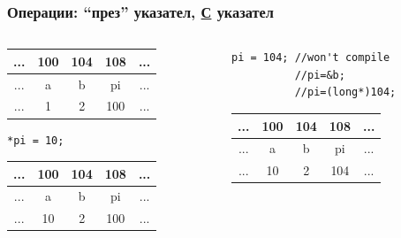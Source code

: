 \documentclass{beamer}
\begin{document}
\begin{frame}[fragile]
\frametitle{Операции: ``през'' указател, \underline{С} указател}


\begin{columns}[t]
  \begin{column}{0.5\textwidth}

\begin{center}
  
\begin{tabular}{c | c | c | c | c}
... & 100 & 104 & 108 & ...\\\hline
... & a   & b   & pi  & ... \\\hline
... & 1   & 2   & 100 & ... \\
  
\end{tabular}
\end{center}


\begin{flushleft}
\begin{lstlisting}
*pi = 10;
\end{lstlisting}
\end{flushleft}

\pause

\begin{center}
  
\begin{tabular}{c | c | c | c | c}
... & 100 & 104 & 108 & ...\\\hline
... & a   & b   & pi  & ... \\\hline
... & \alert{10}   & 2   & 100 & ... \\
  
\end{tabular}
\end{center}


  \end{column}
  \begin{column}{0.5\textwidth}

\pause
\begin{flushleft}
\begin{lstlisting}
pi = 104; //won't compile
          //pi=&b;
          //pi=(long*)104;
\end{lstlisting}
\end{flushleft}

\begin{center}
  
\pause

\begin{tabular}{c | c | c | c | c}
... & 100 & 104 & 108 & ...\\\hline
... & a   & b   & pi  & ... \\\hline
... & 10  & 2   & \alert{104} & ... \\
  

\end{tabular}
\end{center}
\end{column}
\end{columns}
\end{frame}
\end{document}
